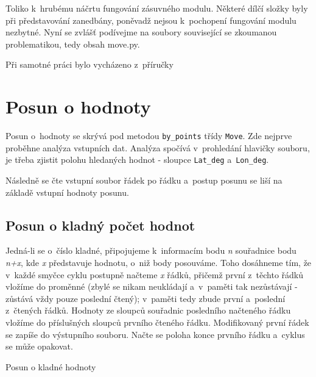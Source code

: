Toliko k~hrubému náčrtu fungování zásuvného modulu. Některé dílčí složky byly při představování
zane\-dbány, poněvadž nejsou k~pochopení fungování mo\-dulu nezbytné. Nyní se zvlášť podívejme na
soubory související se zkoumanou pro\-blematikou, tedy obsah move.py. 

Při samotné práci bylo vycházeno z~příručky \citep{cookbook}


\section{Posun o hodnoty}
\label{by_points}

Posun o~hodnoty se skrývá pod metodou {\tt by\_points} třídy {\tt Move}.
Zde nejprve proběhne analýza vstupních dat.
Analýza spočívá v~prohledání hlavičky souboru, je třeba zjistit polohu hledaných hodnot - sloupce
{\tt Lat\_deg} a~{\tt Lon\_deg}. 

Následně se čte vstupní soubor řádek po řádku a~postup posunu se liší na základě vstupní hodnoty posunu. 

\subsection{Posun o kladný počet hodnot}
\label{kladnehodnoty}

Jedná-li se o~číslo kladné, připojujeme k~informacím bodu \textit{n} souřadnice bodu
\textit{n+x}, kde \textit{x} představuje hodnotu, o~niž body posouváme. Toho dosáhneme tím, že
v~každé smyčce cyklu postupně načteme \textit{x} řádků, přičemž první z~těchto řádků vložíme do proměnné
(zbylé se nikam neukládají a~v~paměti tak nezůstávají - zůstává vždy pouze poslední čtený);
v~paměti tedy zbude první a~poslední z~čtených řádků. Hodnoty ze sloupců souřadnic posledního
načteného řádku vložíme do příslušných sloupců prvního čteného řádku. Modifikovaný první
řádek se zapíše do výstupního souboru. Načte se poloha konce prvního řádku a~cyklus se může opakovat. 

\begin{algorithm}
\label{fig:pseudokladnehodnoty}
    \caption{Posun o kladné hodnoty}
    \begin{algorithmic}[1]

    \ENDWHILE
    \end{algorithmic}
\end{algorithm}

